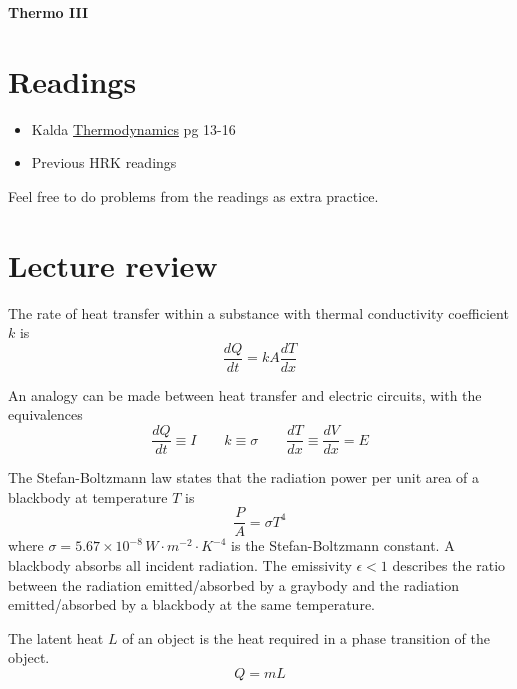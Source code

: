\documentclass[11pt]{scrartcl}
\title{\titlee}
\author{Cambridge Physics Academy}
\date{2023-2024}
\newcommand{\titlee}{Thermo III}
\begin{document}
\thispagestyle{empty}
\begin{center}
    
    
    \Huge \textbf{\textsf{\titlee}}

    \large \theauthor
\end{center}

\setcounter{section}{-1}
\section{Readings}
\begin{itemize}
    \item Kalda \href{https://www.ioc.ee/~kalda/ipho/Thermodyn.pdf}{Thermodynamics} pg 13-16
    \item Previous HRK readings
\end{itemize}
Feel free to do problems from the readings as extra practice.


\section{Lecture review}
\begin{defn}[Conduction]
    The rate of heat transfer within a substance with thermal conductivity coefficient $k$ is $$\frac{dQ}{dt}=kA\frac{dT}{dx}$$
\end{defn}

\begin{theorem}
An analogy can be made between heat transfer and electric circuits, with the equivalences $$\frac{dQ}{dt}\equiv I\qquad k\equiv \sigma\qquad \frac{dT}{dx}\equiv\frac{dV}{dx}= E$$
\end{theorem}

\begin{defn}[Radiation]
    The Stefan-Boltzmann law states that the radiation power per unit area of a blackbody at temperature $T$ is $$\frac{P}{A}=\sigma T^4$$
    where $\sigma = 5.67 \times 10^{-8} \,\unit{W\cdot m^{-2}\cdot K^{-4}}$ is the Stefan-Boltzmann constant. A blackbody absorbs all incident radiation. The emissivity $\epsilon<1$ describes the ratio between the radiation emitted/absorbed by a graybody and the radiation emitted/absorbed by a blackbody at the same temperature. 
\end{defn}

\begin{defn}
    The latent heat $L$ of an object is the heat required in a phase transition of the object. $$Q=mL$$
\end{defn}
\end{document}
